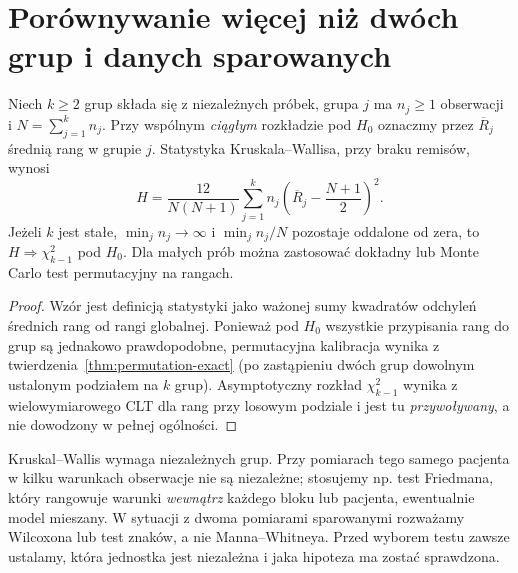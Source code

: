 \section{Porównywanie więcej niż dwóch grup i danych sparowanych}
\begin{stwierdzenie}
\label{prop:kruskal-wallis}
Niech $k\ge2$ grup składa się z niezależnych próbek,
grupa $j$ ma $n_j\ge1$ obserwacji i
$N=\sum_{j=1}^kn_j$. Przy wspólnym \emph{ciągłym}
rozkładzie pod $H_0$ oznaczmy przez $\overline R_j$
średnią rang w grupie $j$.
Statystyka Kruskala--Wallisa, przy braku remisów, wynosi
\[
 H=\frac{12}{N(N+1)}
 \sum_{j=1}^kn_j
 \left(\overline R_j-\frac{N+1}{2}\right)^2.
\]
Jeżeli $k$ jest stałe, $\min_jn_j\to\infty$ i
$\min_j n_j/N$ pozostaje oddalone od zera,
to $H\Rightarrow\chi^2_{k-1}$ pod $H_0$.
Dla małych prób można zastosować dokładny lub
Monte Carlo test permutacyjny na rangach.
\end{stwierdzenie}
\begin{proof}
Wzór jest definicją statystyki jako ważonej sumy
kwadratów odchyleń średnich rang od rangi globalnej.
Ponieważ pod $H_0$ wszystkie przypisania rang do grup
są jednakowo prawdopodobne, permutacyjna kalibracja
wynika z twierdzenia~\ref{thm:permutation-exact}
(po zastąpieniu dwóch grup dowolnym ustalonym
podziałem na $k$ grup). Asymptotyczny rozkład
$\chi^2_{k-1}$ wynika z wielowymiarowego CLT dla
rang przy losowym podziale i jest tu \emph{przywoływany},
a nie dowodzony w pełnej ogólności.
\end{proof}

\begin{uwaga}
Kruskal--Wallis wymaga niezależnych grup.
Przy pomiarach tego samego pacjenta w kilku warunkach
obserwacje nie są niezależne; stosujemy np.
test Friedmana, który rangowuje warunki \emph{wewnątrz}
każdego bloku lub pacjenta, ewentualnie model mieszany.
W sytuacji z dwoma pomiarami sparowanymi
rozważamy Wilcoxona lub test znaków,
a nie Manna--Whitneya.
Przed wyborem testu zawsze ustalamy, która jednostka
jest niezależna i jaka hipoteza ma zostać sprawdzona.
\end{uwaga}

